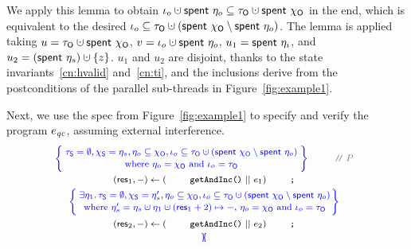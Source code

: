 We apply this lemma to obtain $\ikno \hunion \Tomb~\gisto \subseteq
\tkno \hunion \Tomb~\histo$ in the end, which is equivalent to the
desired $\ikno \subseteq \tkno \hunion (\Tomb~\histo \setminus
\Tomb~\gisto)$. The lemma is applied taking $u = \tkno \hunion
\Tomb~\histo$, $v = \ikno \hunion \Tomb~\gisto$, $u_1 =
\mathsf{spent}~\eta_i$, and $u_2= (\Tomb~\gists) \hunion \set{z}$. $u_1$ and
$u_2$ are disjoint, thanks to the state invariants~\ref{cn:hvalid}
and~\ref{cn:ti}, and the inclusions derive from the postconditions of
the parallel sub-threads in Figure~\ref{fig:example1}.

Next, we use the spec from Figure~\ref{fig:example1} to specify and
verify the program $e_{\mathit{qc}}$, assuming external interference.
%
\[
\!\!\!
{\small{
\begin{array}{c}
  \spec{\!\!
  \begin{array}{c}
    \tkns = \emptyset,
    \hists = \gists,
    \gisto \subseteq \histo, \ikno \subseteq \tkno \hunion (\Tomb~\histo \setminus \Tomb~\gisto)\\[2pt]
\mbox{where $\gisto = \histo$ and $\ikno = \tkno$}
  \end{array}
  \!\!}
  ~\comm{P}
  \\\\[-6pt]
  (\res_1, -) \Asgn (\esc{getAndInc()} ~||~ e_1) \esc{;}
  \\[3pt]
%
%
{{
\spec{\!\!
\begin{array}{c}
 \exists \gist_1\ldot \tkns = \emptyset\aand \hists = \gists', \gisto \subseteq \histo \aand \ikno \subseteq \tkno \hunion (\Tomb~\histo \setminus \Tomb~\gisto)\\[2pt]
\mbox{where 
 $\gists' = \gists \hunion
\gist_1 \hunion (\res_1 + 2)\mapsto -$, $\gisto = \histo$ and $\ikno = \tkno$}
  \end{array}
\!\!\!}
}}
%
\\\\[-5pt]
(\res_2, -) \Asgn (\esc{getAndInc()} ~||~ e_2) \esc{;}      
\\[3pt]
\spec{\!\!\!\!
\begin{array}{c}

\end{array}}
\end{array}}}\]
